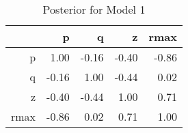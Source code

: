\begin{table}[ht]
\centering
\begin{tabular}{rrrrr}
  \hline
 & p & q & z & rmax \\ 
  \hline
p & 1.00 & -0.16 & -0.40 & -0.86 \\ 
  q & -0.16 & 1.00 & -0.44 & 0.02 \\ 
  z & -0.40 & -0.44 & 1.00 & 0.71 \\ 
  rmax & -0.86 & 0.02 & 0.71 & 1.00 \\ 
   \hline
\end{tabular}
\caption{Posterior for Model 1} 
\label{tab:param_correlations_post_model_1}
\end{table}

